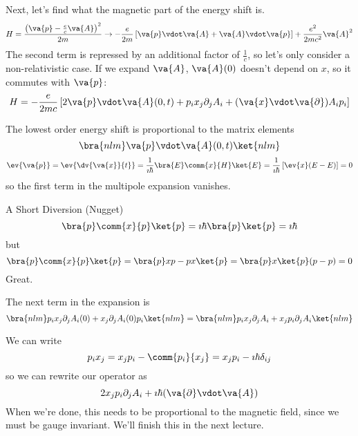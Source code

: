 \documentclass[a4paper,twoside,master.tex]{subfiles}
\begin{document}
Next, let's find what the magnetic part of the energy shift is.
\begin{equation}
    H = \frac{\left( \va{p} - \frac{e}{c} \va{A} \right)^2}{2m} \to - \frac{e}{2m} \left[ \va{p} \vdot \va{A} + \va{A} \vdot \va{p} \right] + \frac{e^2}{2mc^2} \va{A}^2
\end{equation}
The second term is repressed by an additional factor of $ \frac{1}{c} $, so let's only consider a non-relativistic case. If we expand $ \va{A} $, $ \va{A}(0) $ doesn't depend on $ x $, so it commutes with $ \va{p} $:
\begin{equation}
    H = - \frac{e}{2mc} \left[ 2 \va{p} \vdot \va{A}(0,t) + p_i x_j \partial_j A_i + (\va{x} \vdot \va{\partial})A_i p_i \right]
\end{equation}

The lowest order energy shift is proportional to the matrix elements
\begin{equation}
    \bra{nlm} \va{p} \vdot \va{A}(0,t)\ket{nlm}
\end{equation}
\begin{equation}
    \ev{\va{p}} = \ev{\dv{\va{x}}{t}} = \frac{1}{\imath \hbar}\bra{E} \comm{x}{H}\ket{E} = \frac{1}{\imath \hbar} \left[ \ev{x} (E-E) \right] = 0
\end{equation}
so the first term in the multipole expansion vanishes.

\begin{note}{A Short Diversion (Nugget)}
    \begin{equation}
        \bra{p} \comm{x}{p}\ket{p} = \imath \hbar\bra{p}\ket{p} = \imath \hbar
    \end{equation}
    but
    \begin{equation}
        \bra{p} \comm{x}{p}\ket{p} =\bra{p} xp - px\ket{p} =\bra{p} x\ket{p} (p-p) = 0
    \end{equation}
    Great.
\end{note}

The next term in the expansion is
\begin{equation}
    \bra{nlm} p_i x_j \partial_j A_i(0) + x_j \partial_j A_i(0) p_i\ket{nlm} =\bra{nlm} p_i x_j \partial_j A_i + x_j p_i \partial_j A_i\ket{nlm}
\end{equation}

We can write
\begin{equation}
    p_i x_j = x_j p_i - \comm{p_i}{x_j} = x_j p_i - \imath \hbar \delta_{ij} 
\end{equation}
so we can rewrite our operator as
\begin{equation}
    2 x_j p_i \partial_j A_i + \imath \hbar (\va{\partial} \vdot \va{A})
\end{equation}
When we're done, this needs to be proportional to the magnetic field, since we must be gauge invariant. We'll finish this in the next lecture.
\end{document}
